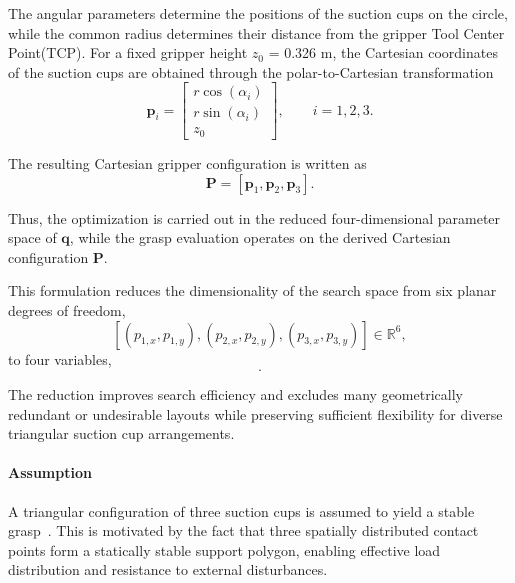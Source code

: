 The angular parameters determine the positions of the suction cups on the circle, while the common
radius determines their distance from the gripper Tool Center Point(TCP). For a fixed gripper height $z_0$ = 0.326 m, the
Cartesian coordinates of the suction cups are obtained through the polar-to-Cartesian transformation
\begin{equation}
    \mathbf{p}_i =
    \begin{bmatrix}
        r\cos(\alpha_i) \\
        r\sin(\alpha_i) \\
        z_0
    \end{bmatrix},
    \qquad i=1,2,3.
\end{equation}

The resulting Cartesian gripper configuration is written as
\begin{equation}
    \mathbf{P} = [\mathbf{p}_1,\mathbf{p}_2,\mathbf{p}_3].
\end{equation}

Thus, the optimization is carried out in the reduced four-dimensional parameter space of
$\mathbf{q}$, while the grasp evaluation operates on the derived Cartesian configuration
$\mathbf{P}$.

This formulation reduces the dimensionality of the search space from six planar degrees of freedom,
\begin{equation}
    \left[(p_{1,x},p_{1,y}),(p_{2,x},p_{2,y}),(p_{3,x},p_{3,y})\right] \in \mathbb{R}^6,
\end{equation}
to four variables,
\begin{equation}
    [r,\alpha_1,\alpha_2,\alpha_3].
\end{equation}

The reduction improves search efficiency and excludes many geometrically redundant or undesirable
layouts while preserving sufficient flexibility for diverse triangular suction cup arrangements.

\paragraph{Assumption}
A triangular configuration of three suction cups is assumed to yield a stable
grasp~\cite{madan2022realrobotchallenge2021}. This is motivated by the fact that three spatially
distributed contact points form a statically stable support polygon, enabling effective load
distribution and resistance to external disturbances.

